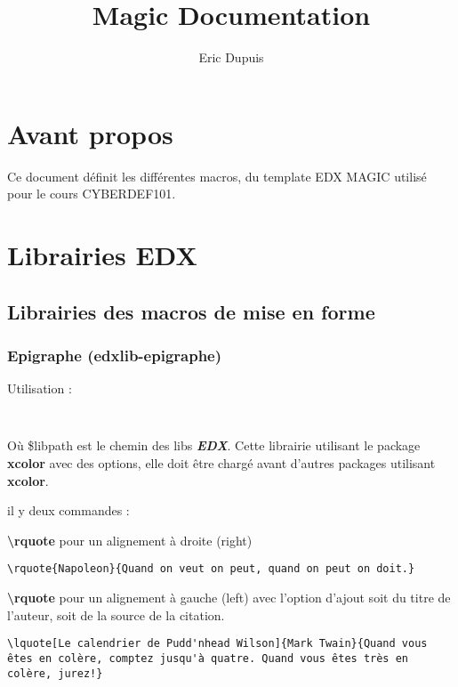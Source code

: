 \documentclass[a4paper,10pt,twocolumn]{article}
\title{Magic Documentation}
\author{Eric Dupuis}
\def\EDX{\textit{\textbf{EDX}}}
\def\lib{librairie }
\begin{document}
\maketitle

\section{Avant propos}

Ce document définit les différentes macros, du template EDX MAGIC utilisé pour le cours CYBERDEF101.

\section{Librairies EDX}

\subsection{Librairies des macros de mise en forme}

\subsubsection{Epigraphe (edxlib-epigraphe)}

Utilisation :
\begin{lstlisting}[style=LATEX]
% inclusion de librairies EDX


\end{lstlisting}	

Où \$libpath est le chemin des libs \EDX. Cette \lib utilisant le package \textbf{xcolor} avec des options, elle doit être chargé avant d'autres packages utilisant \textbf{xcolor}.

il y deux commandes :

\textbf{\textbackslash rquote} pour un alignement à droite (right)

\begin{lstlisting}[style=LATEX]
\rquote{Napoleon}{Quand on veut on peut, quand on peut on doit.}
\end{lstlisting}	


\textbf{\textbackslash rquote} pour un alignement à gauche (left) avec l'option d'ajout soit du titre de l'auteur, soit de la source de la citation.

\begin{lstlisting}[style=LATEX]
\lquote[Le calendrier de Pudd'nhead Wilson]{Mark Twain}{Quand vous êtes en colère, comptez jusqu'à quatre. Quand vous êtes très en colère, jurez!}
\end{lstlisting}
\end{document}
